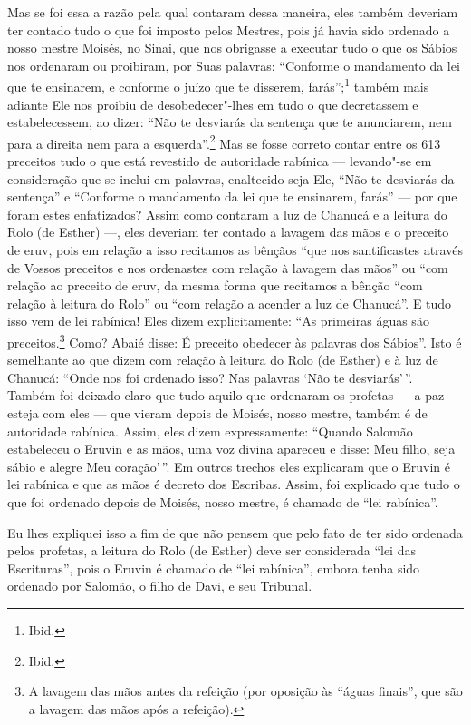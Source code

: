 Mas se foi essa a razão pela qual contaram dessa maneira, eles também
deveriam ter contado tudo o que foi imposto pelos Mestres, pois já havia
sido ordenado a nosso mestre Moisés, no Sinai, que nos obrigasse a
executar tudo o que os Sábios nos ordenaram ou proibiram, por Suas
palavras: ``Conforme o mandamento da lei que te ensinarem, e conforme o
juízo que te disserem, farás'';\footnote{Ibid.} também mais
adiante Ele nos proibiu de desobedecer"-lhes em tudo o que decretassem e
estabelecessem, ao dizer: ``Não te desviarás da sentença que te
anunciarem, nem para a direita nem para a esquerda''.\footnote{Ibid.} Mas se
fosse correto contar entre os 613 preceitos tudo o que está revestido de
autoridade rabínica --- levando"-se em consideração que se inclui em
palavras, enaltecido seja Ele, ``Não te desviarás da sentença'' e
``Conforme o mandamento da lei que te ensinarem, farás'' --- por que
foram estes enfatizados? Assim como contaram a luz de Chanucá\starr{} e a
leitura do Rolo (de Esther) ---, eles deveriam ter contado a lavagem das
mãos e o preceito de eruv\starr, pois em relação a
isso recitamos as bênçãos ``que nos santificastes
através de Vossos preceitos e nos ordenastes com relação à lavagem das
mãos'' ou ``com relação ao preceito de eruv\starr, da mesma forma que
recitamos a bênção ``com relação à leitura do Rolo'' ou ``com relação a
acender a luz de Chanucá\starr''. E tudo isso vem de lei rabínica! Eles
dizem explicitamente: ``As primeiras águas são
preceitos.\footnote{A lavagem das mãos antes da refeição (por oposição às ``águas
  finais'', que são a lavagem das mãos após a refeição).} Como? Abaié\starr{} disse: É preceito obedecer às
palavras dos Sábios''. Isto é semelhante ao que dizem com relação à
leitura do Rolo (de Esther) e à luz de Chanucá\starr: ``Onde nos foi ordenado
isso? Nas palavras `Não te desviarás'\,''. Também foi deixado claro que
tudo aquilo que ordenaram os profetas --- a paz esteja com eles --- que
vieram depois de Moisés, nosso mestre, também é de autoridade rabínica.
Assim, eles dizem expressamente: ``Quando Salomão estabeleceu o Eruvin\starr{}
e as mãos, uma voz divina apareceu e disse: Meu
filho, seja sábio e alegre Meu coração'\,''. Em outros trechos eles
explicaram que o Eruvin\starr{} é lei rabínica e que as
mãos é decreto dos Escribas. Assim, foi explicado
que tudo o que foi ordenado depois de Moisés, nosso mestre, é chamado de
``lei rabínica''.

Eu lhes expliquei isso a fim de que não pensem que pelo fato de ter sido
ordenada pelos profetas, a leitura do Rolo (de Esther) deve ser
considerada ``lei das Escrituras'', pois o Eruvin\starr{} é chamado de
``lei rabínica'', embora tenha sido ordenado por Salomão, o filho de
Davi, e seu Tribunal.

